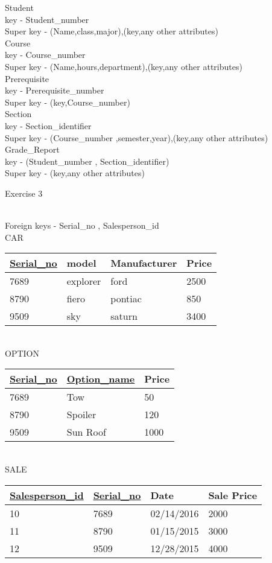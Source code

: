 \documentclass[a4paper,10pt]{article}
\begin{document}
\flushleft
Student\\
key - Student\_number\\
Super key - (Name,class,major),(key,any other attributes)\\
Course\\
key - Course\_number\\
Super key - (Name,hours,department),(key,any other attributes)\\
Prerequisite\\
key - Prerequisite\_number\\
Super key - (key,Course\_number)\\
Section\\
key - Section\_identifier\\
Super key - (Course\_number ,semester,year),(key,any other attributes)\\
Grade\_Report\\
key - (Student\_number , Section\_identifier)\\
Super key - (key,any other attributes)\\
\begin{large}
Exercise 3
\end{large}
\\
Foreign keys - Serial\_no , Salesperson\_id \\
CAR
\begin{tabular}{|l|l|l|l|}
	\hline
	\underline{Serial\_no} & model & Manufacturer & Price \\ \hline
	7689 & explorer & ford & 2500 \\ \hline
	8790 & fiero & pontiac & 850 \\ \hline
	9509 & sky & saturn &  3400 \\ \hline

\end{tabular} 
\\
\bigskip
OPTION
\begin{tabular}{|l|l|l|}
	\hline
	\underline{Serial\_no} & \underline{Option\_name} & Price \\ \hline
	7689 & Tow & 50 \\ \hline
	8790 & Spoiler & 120 \\ \hline
	9509 & Sun Roof & 1000 \\ \hline

\end{tabular} 
\\
\bigskip
SALE
\begin{tabular}{|l|l|l|l|}
	\hline
	\underline{Salesperson\_id} & \underline{Serial\_no} & Date & Sale Price \\ \hline
	10 & 7689 & 02/14/2016 & 2000 \\ \hline
	11 & 8790 & 01/15/2015 & 3000 \\ \hline
	12 & 9509 & 12/28/2015 & 4000 \\ \hline

\end{tabular}
\end{document}
